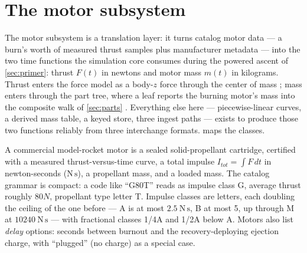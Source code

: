 \section{The motor subsystem}\label{sec:motors}

The motor subsystem is a translation layer: it turns catalog motor data --- a burn's worth
of measured thrust samples plus manufacturer metadata --- into the two time functions the
simulation core consumes during the powered ascent of \cref{sec:primer}: thrust $F(t)$ in
newtons and motor mass $m(t)$ in kilograms. Thrust enters the force model as a body-$z$
force through the center of mass ; mass enters through the
part tree, where a  leaf reports the burning motor's mass into the
composite walk of \cref{sec:parts} . Everything else here ---
piecewise-linear curves, a derived mass table, a keyed store, three ingest paths ---
exists to produce those two functions reliably from three interchange formats.
 maps the classes.

\begin{physbox}
A commercial model-rocket motor is a sealed solid-propellant cartridge, certified with a
measured thrust-versus-time curve, a total impulse $I_{tot}=\int F\,dt$ in newton-seconds
($\mathrm{N\,s}$), a propellant mass, and a loaded mass. The catalog grammar is compact:
a code like ``G80T'' reads as impulse class G, average thrust roughly $80\unit{N}$,
propellant type letter T. Impulse classes are letters, each doubling the ceiling of the
one before --- A is at most $2.5\ \mathrm{N\,s}$, B at most 5, up through M at
$10240\ \mathrm{N\,s}$ --- with fractional classes 1/4A and 1/2A below A. Motors also
list \emph{delay} options: seconds between burnout and the recovery-deploying ejection
charge, with ``plugged'' (no charge) as a special case.
\end{physbox}


